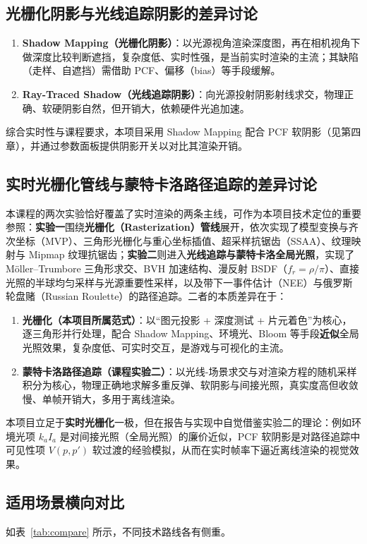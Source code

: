 \documentclass[11pt, a4paper, oneside]{report}
\newcommand{\keyword}[1]{\textbf{#1}}
\begin{document}
\subsection{光栅化阴影与光线追踪阴影的差异讨论}
\begin{enumerate}
    \item \textbf{Shadow Mapping（光栅化阴影）}：以光源视角渲染深度图，再在相机视角下做深度比较判断遮挡，复杂度低、实时性强，是当前实时渲染的主流；其缺陷（走样、自遮挡）需借助 PCF、偏移（bias）等手段缓解。
    \item \textbf{Ray-Traced Shadow（光线追踪阴影）}：向光源投射阴影射线求交，物理正确、软硬阴影自然，但开销大，依赖硬件光追加速。
\end{enumerate}
综合实时性与课程要求，本项目采用 Shadow Mapping 配合 PCF 软阴影（见第四章），并通过参数面板提供阴影开关以对比其渲染开销。

\subsection{实时光栅化管线与蒙特卡洛路径追踪的差异讨论}
本课程的两次实验恰好覆盖了实时渲染的两条主线，可作为本项目技术定位的重要参照：\keyword{实验一}围绕\keyword{光栅化（Rasterization）管线}展开，依次实现了模型变换与齐次坐标（MVP）、三角形光栅化与重心坐标插值、超采样抗锯齿（SSAA）、纹理映射与 Mipmap 纹理抗锯齿；\keyword{实验二}则进入\keyword{光线追踪与蒙特卡洛全局光照}，实现了 Möller--Trumbore 三角形求交、BVH 加速结构、漫反射 BSDF（$f_r=\rho/\pi$）、直接光照的半球均匀采样与光源重要性采样，以及带下一事件估计（NEE）与俄罗斯轮盘赌（Russian Roulette）的路径追踪。二者的本质差异在于：
\begin{enumerate}
    \item \textbf{光栅化（本项目所属范式）}：以“图元投影 + 深度测试 + 片元着色”为核心，逐三角形并行处理，配合 Shadow Mapping、环境光、Bloom 等手段\keyword{近似}全局光照效果，复杂度低、可实时交互，是游戏与可视化的主流。
    \item \textbf{蒙特卡洛路径追踪（课程实验二）}：以光线-场景求交与对渲染方程的随机采样积分为核心，物理正确地求解多重反弹、软阴影与间接光照，真实度高但收敛慢、单帧开销大，多用于离线渲染。
\end{enumerate}
本项目立足于\keyword{实时光栅化}一极，但在报告与实现中自觉借鉴实验二的理论：例如环境光项 $k_a I_a$ 是对间接光照（全局光照）的廉价近似，PCF 软阴影是对路径追踪中可见性项 $V(p,p')$ 软过渡的经验模拟，从而在实时帧率下逼近离线渲染的视觉效果。

\subsection{适用场景横向对比}
如表~\ref{tab:compare} 所示，不同技术路线各有侧重。
\end{document}
